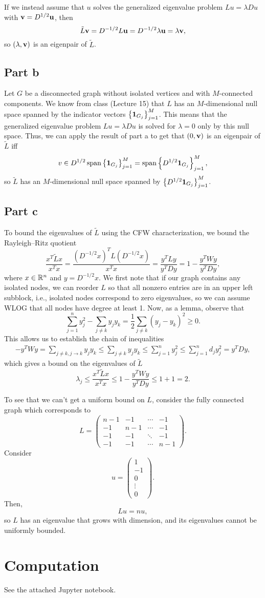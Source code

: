 \documentclass{article}
\begin{document}
If we instead assume that $u$ solves the generalized eigenvalue problem $Lu = \lambda Du$ with $\mathbf{v} = D^{1/2}\mathbf{u}$, then 
\[
\tilde L\mathbf{v}=D^{-1/2}L\mathbf{u}=D^{-1/2}\lambda\mathbf{u}=\lambda\mathbf{v},
\]
so $(\lambda, \mathbf{v})$ is an eigenpair of $\tilde{L}$.

\subsection{Part b}
Let $G$ be a disconnected graph without isolated vertices and with $M$-connected components. We know from class (Lecture 15) that $L$ has an $M$-dimensional null space spanned by the indicator vectors $\left\{\mathbf{1}_{G_j}\right\}_{j=1}^M$. This means that the generalized eigenvalue problem $Lu = \lambda Du$ is solved for $\lambda=0$ only by this null space. Thus, we can apply the result of part a to get that $(0,\mathbf{v})$ is an eigenpair of $\tilde L$ iff 
\[
v\in D^{1/2}\operatorname{span}\left\{\mathbf{1}_{G_j}\right\}_{j=1}^M=\operatorname{span}\left\{D^{1/2}\mathbf{1}_{G_j}\right\}_{j=1}^M,
\]
so $\tilde L$ has an $M$-dimensional null space spanned by $\left\{D^{1/2}\mathbf{1}_{G_j}\right\}_{j=1}^M$.

\subsection{Part c}
To bound the eigenvalues of $\tilde L$ using the CFW characterization, we bound the Rayleigh--Ritz quotient
\[
\frac{x^T\tilde Lx}{x^Tx}=\frac{(D^{-1/2}x)^T L(D^{-1/2}x)}{x^Tx}=\frac{y^T Ly}{y^TDy}=1-\frac{y^T Wy}{y^TDy},
\]
where $x\in\mathbb{R}^n$ and $y=D^{-1/2}x$. We first note that if our graph contains any isolated nodes, we can reorder $L$ so that all nonzero entries are in an upper left subblock, i.e., isolated nodes correspond to zero eigenvalues, so we can assume WLOG that all nodes have degree at least 1. Now, as a lemma, observe that 
\[
\sum_{j=1}^{n}y_j^2-\sum_{j\neq k}y_jy_k=\frac{1}{2}\sum_{j\neq k}(y_j-y_k)^2\geq0.
\]
This allows us to establish the chain of inequalities
\begin{align*}
-y^TWy=\sum_{j\neq k,j\to k}y_jy_k\leq\sum_{j\neq k}y_jy_k\leq\sum_{j=1}^{n}y_j^2\leq\sum_{j=1}^{n}d_jy_j^2=y^TDy,
\end{align*}
which gives a bound on the eigenvalues of $\tilde L$
\[
\lambda_j\leq\frac{x^T\tilde Lx}{x^Tx}\leq1-\frac{y^T Wy}{y^TDy}\leq1+1=2.
\]

To see that we can't get a uniform bound on $L$, consider the fully connected graph which corresponds to
\[
L=\begin{pmatrix}
	n-1&-1&\cdots&-1\\
	-1&n-1&\cdots&-1\\
	-1&-1&\ddots&-1\\
	-1&-1&\cdots&n-1
\end{pmatrix}.
\]
Consider 
\[
u=\begin{pmatrix}
	1\\-1\\0\\\vdots\\0
\end{pmatrix}.
\]
Then,
\[
Lu=nu,
\]
so $L$ has an eigenvalue that grows with dimension, and its eigenvalues cannot be uniformly bounded.

\section{Computation}
See the attached Jupyter notebook.
\end{document}
